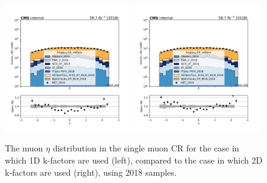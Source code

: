 \begin{figure}
    \begin{center}
        \includegraphics[width=0.49\textwidth]{fig/datamc/cr_1m_vbf/cr_1m_vbf_muon_eta_losf_2018.pdf}
        \includegraphics[width=0.49\textwidth]{fig/datamc_2dkfac/cr_1m_vbf/cr_1m_vbf_muon_eta_losf_2018.pdf} 
        \caption{The muon $\eta$ distribution in the single muon CR for the case in which 1D k-factors are used (left), 
        compared to the case in which 2D k-factors are used (right), using 2018 samples.}
        \label{fig:muon_eta_2018}
    \end{center}
\end{figure}